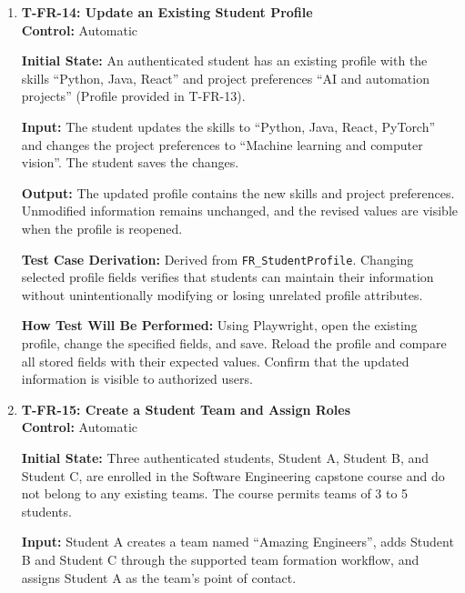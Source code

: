 \documentclass[12pt, titlepage]{article}
\begin{document}
\begin{enumerate}
\textbf{How Test Will Be Performed:} Using Playwright, authenticate as the student, complete the profile form, and save it. Reopen the profile and verify all stored fields. Authenticate as another authorized student and an approved supervisor to verify profile visibility.

\item \label{T-FR-14}\textbf{T-FR-14: Update an Existing Student Profile}\\

\textbf{Control:} Automatic

\textbf{Initial State:} An authenticated student has an existing profile with the skills ``Python, Java, React'' and project preferences ``AI and automation projects'' (Profile provided in T-FR-13).

\textbf{Input:} The student updates the skills to ``Python, Java, React, PyTorch'' and changes the project preferences to ``Machine learning and computer vision''. The student saves the changes.

\textbf{Output:} The updated profile contains the new skills and project preferences. Unmodified information remains unchanged, and the revised values are visible when the profile is reopened.

\textbf{Test Case Derivation:} Derived from \texttt{FR\_StudentProfile}. Changing selected profile fields verifies that students can maintain their information without unintentionally modifying or losing unrelated profile attributes.

\textbf{How Test Will Be Performed:} Using Playwright, open the existing profile, change the specified fields, and save. Reload the profile and compare all stored fields with their expected values. Confirm that the updated information is visible to authorized users.

\item \label{T-FR-15}\textbf{T-FR-15: Create a Student Team and Assign Roles}\\

\textbf{Control:} Automatic

\textbf{Initial State:} Three authenticated students, Student A, Student B, and Student C, are enrolled in the Software Engineering capstone course and do not belong to any existing teams. The course permits teams of 3 to 5 students.

\textbf{Input:} Student A creates a team named ``Amazing Engineers'', adds Student B and Student C through the supported team formation workflow, and assigns Student A as the team's point of contact.


\end{enumerate}
\end{document}
